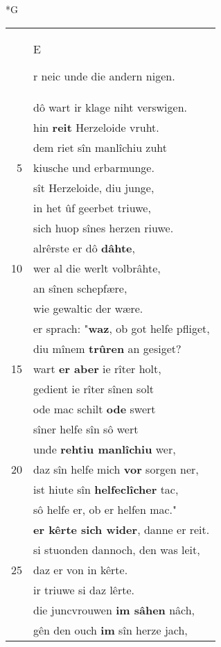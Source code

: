 \documentclass[8pt,a4paper,notitlepage]{article}
\begin{document}
\newpage
\begin{table}[ht]
\begin{minipage}[t]{0.5\linewidth}
\small
\begin{center}*G
\end{center}
\begin{tabular}{rl}
 & \begin{large}E\end{large}r neic unde die andern nigen.\\ 
 & dô wart ir klage niht verswigen.\\ 
 & hin \textbf{reit} Herzeloide vruht.\\ 
 & dem riet sîn manlîchiu zuht\\ 
5 & kiusche und erbarmunge.\\ 
 & sît Herzeloide, diu junge,\\ 
 & in het ûf geerbet triuwe,\\ 
 & sich huop sînes herzen riuwe.\\ 
 & alrêrste er dô \textbf{dâhte},\\ 
10 & wer al die werlt volbrâhte,\\ 
 & an sînen schepfære,\\ 
 & wie gewaltic der wære.\\ 
 & er sprach: "\textbf{waz}, ob got helfe pfliget,\\ 
 & diu mînem \textbf{trûren} an gesiget?\\ 
15 & wart \textbf{er aber} ie rîter holt,\\ 
 & gedient ie rîter sînen solt\\ 
 & ode mac schilt \textbf{ode} swert\\ 
 & sîner helfe sîn sô wert\\ 
 & unde \textbf{rehtiu manlîchiu} wer,\\ 
20 & daz sîn helfe mich \textbf{vor} sorgen ner,\\ 
 & ist hiute sîn \textbf{helfeclîcher} tac,\\ 
 & sô helfe er, ob er helfen mac."\\ 
 & \textbf{er kêrte sich wider}, danne er reit.\\ 
 & si stuonden dannoch, den was leit,\\ 
25 & daz er von in kêrte.\\ 
 & ir triuwe si daz lêrte.\\ 
 & die juncvrouwen \textbf{im sâhen} nâch,\\ 
 & gên den ouch \textbf{im} sîn herze jach,\\ 

\end{tabular}
\end{minipage}
\end{table}
\end{document}
